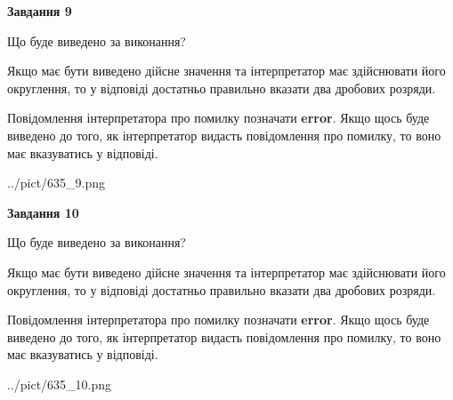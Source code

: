 \documentclass[12pt, ukrainian]{article}
\begin{document}
{\begin {Large}
{\begin {center}\textbf{Завдання 9}\end {center}}\par
Що буде виведено за виконання? \par

Якщо має бути виведено дійсне значення та інтерпретатор має здійснювати його округлення, 
то у відповіді достатньо правильно вказати два дробових розряди.

Повідомлення інтерпретатора про помилку позначати \textbf{error}.
Якщо щось буде виведено до того, як інтерпретатор видасть повідомлення про помилку, 
то воно має вказуватись у відповіді. \par

\begin{center}
	{../pict/635_9.png}
\end{center}
\newpage

{\begin {center}\textbf{Завдання 10}\end {center}}\par
Що буде виведено за виконання? \par

Якщо має бути виведено дійсне значення та інтерпретатор має здійснювати його округлення, 
то у відповіді достатньо правильно вказати два дробових розряди.

Повідомлення інтерпретатора про помилку позначати \textbf{error}.
Якщо щось буде виведено до того, як інтерпретатор видасть повідомлення про помилку, 
то воно має вказуватись у відповіді. \par

\begin{center}
	{../pict/635_10.png}
\end{center}
\newpage

\end {Large}}
\end{document}
